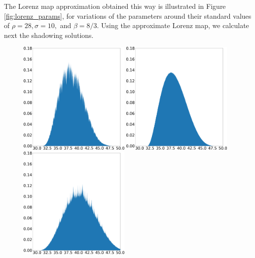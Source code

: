 \documentclass[preprint,12pt]{elsarticle}
\begin{document}
The Lorenz map approximation obtained this way is illustrated in Figure \ref{fig:lorenz_params}, for variations of the parameters around their standard values of 
$\rho = 28, \sigma = 10,$ and $\beta = 8/3.$ Using the approximate Lorenz map, we calculate next the shadowing solutions. 
\begin{figure}
    \centering
    \includegraphics[width=0.48\textwidth]{lorenz_shadow_density_lorenz_zmax_15_28_2.67.json.png}
    \hspace{0.005\textwidth}
    \includegraphics[width=0.48\textwidth]{baseline_density_lorenz_zmax_15_28_2.67.json.png}
    \\
    \includegraphics[width=0.48\textwidth]{lorenz_shadow_density_lorenz_zmax_10_30_2.67.json.png}

\end{figure}
\end{document}
